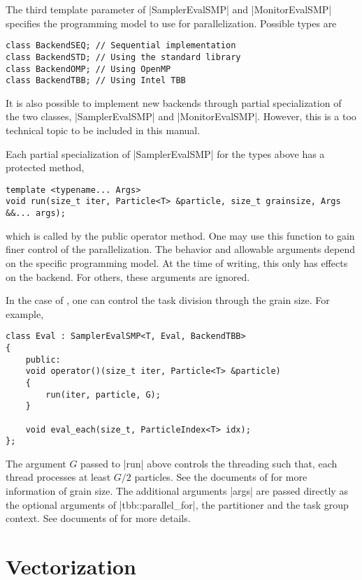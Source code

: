 The third template parameter of |SamplerEvalSMP| and |MonitorEvalSMP| specifies
the programming model to use for parallelization. Possible types are
\begin{verbatim}
class BackendSEQ; // Sequential implementation
class BackendSTD; // Using the standard library
class BackendOMP; // Using OpenMP
class BackendTBB; // Using Intel TBB
\end{verbatim}
It is also possible to implement new backends through partial specialization of
the two classes, |SamplerEvalSMP| and |MonitorEvalSMP|. However, this is a too
technical topic to be included in this manual.

Each partial specialization of |SamplerEvalSMP| for the types above has a
protected method,
\begin{verbatim}
template <typename... Args>
void run(size_t iter, Particle<T> &particle, size_t grainsize, Args &&... args);
\end{verbatim}
which is called by the public operator method. One may use this function to
gain finer control of the parallelization. The behavior and allowable arguments
depend on the specific programming model. At the time of writing, this only has
effects on the \tbb backend. For others, these arguments are ignored.

In the case of \tbb, one can control the task division through the grain size.
For example,
\begin{verbatim}
class Eval : SamplerEvalSMP<T, Eval, BackendTBB>
{
    public:
    void operator()(size_t iter, Particle<T> &particle)
    {
        run(iter, particle, G);
    }

    void eval_each(size_t, ParticleIndex<T> idx);
};
\end{verbatim}
The argument $G$ passed to |run| above controls the threading such that, each
thread processes at least $G / 2$ particles. See the documents of \tbb for more
information of grain size. The additional arguments |args| are passed directly
as the optional arguments of |tbb::parallel_for|, the partitioner and the task
group context. See documents of \tbb for more details.

\section{Vectorization}
\label{sec:Vectorization}


